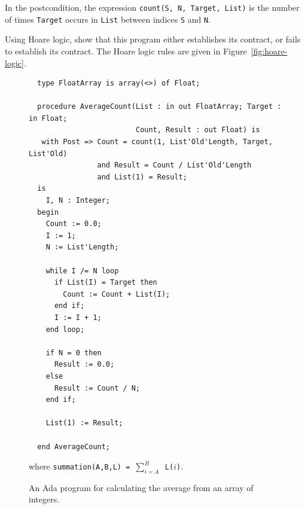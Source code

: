 In the postcondition, the expression {\tt count(S, N, Target, List)} is the number of times \texttt{Target} occurs in \texttt{List} between indices \texttt{S} and \texttt{N}.

Using Hoare logic, show that this program either establishes its contract, or fails to establish its contract. The Hoare logic rules are given in Figure~\ref{fig:hoare-logic}.

\begin{figure}[!h]
\begin{verbatim}
  type FloatArray is array(<>) of Float;

  procedure AverageCount(List : in out FloatArray; Target : in Float;
                         Count, Result : out Float) is
   with Post => Count = count(1, List'Old'Length, Target, List'Old)
                and Result = Count / List'Old'Length
                and List(1) = Result;
  is
    I, N : Integer;
  begin
    Count := 0.0;
    I := 1;
    N := List'Length;

    while I /= N loop
      if List(I) = Target then
        Count := Count + List(I);
      end if;
      I := I + 1;
    end loop;

    if N = 0 then
      Result := 0.0;
    else
      Result := Count / N;
    end if;

    List(1) := Result;

  end AverageCount;
\end{verbatim}

where {\tt summation(A,B,L) = $\sum_{i=A}^{B}$ \tt L($i$)}.

\caption{An Ada program for calculating the average from an array of integers.}
\label{fig:listave}
\end{figure}



